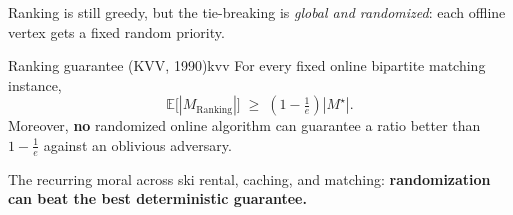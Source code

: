 Ranking is still greedy, but the tie-breaking is \emph{global and randomized}: each offline vertex gets a fixed random priority.

\begin{theorem}{Ranking guarantee (KVV, 1990)}{kvv}
For every fixed online bipartite matching instance,
\[
\mathbb{E}\bigl[|M_{\mathrm{Ranking}}|\bigr] \;\ge\; \left(1 - \tfrac{1}{e}\right)|M^\star|.
\]
Moreover, \textbf{no} randomized online algorithm can guarantee a ratio better than $1 - \tfrac1e$ against an oblivious adversary.
\end{theorem}

The recurring moral across ski rental, caching, and matching: \textbf{randomization can beat the best deterministic guarantee.}